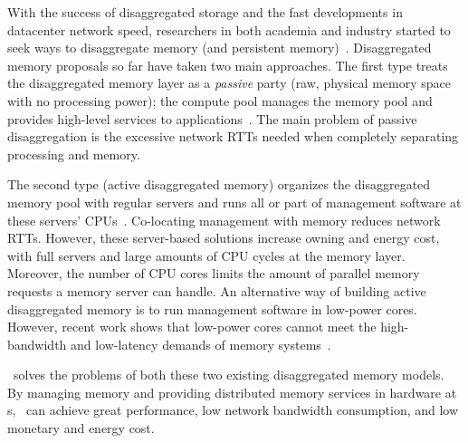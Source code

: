 With the success of disaggregated storage and the fast developments in datacenter network speed,
researchers in both academia and industry started to seek ways to disaggregate memory 
(and persistent memory)~\cite{Lim09-disaggregate,FireBox-FASTKeynote,IntelRackScale,Lim12-HPCA,Shan18-OSDI,RAMCloud,Tsai20-ATC}.
Disaggregated memory proposals so far have taken two main approaches.
The first type treats the disaggregated memory layer as a {\em passive} party (raw, physical memory space with no processing power);
the compute pool manages the memory pool and provides high-level services to applications~\cite{HP-TheMachine,Tsai20-ATC,Lim09-disaggregate,Nitu18-EUROSYS}.
The main problem of passive disaggregation is the excessive network RTTs needed when completely separating processing and memory.

The second type (active disaggregated memory) organizes the disaggregated memory pool with regular servers and runs all or part of management software 
at these servers' CPUs~\cite{InfiniSwap,NAMDB,Kalia14-RDMAKV,Aguilera18-ATC}. 
Co-locating management with memory reduces network RTTs.
However, these server-based solutions increase owning and energy cost, with full servers and large amounts of CPU cycles at the memory layer.
Moreover, the number of CPU cores limits the amount of parallel memory requests a memory server can handle.
An alternative way of building active disaggregated memory is to run management software in low-power cores.
However, recent work shows that low-power cores cannot meet the high-bandwidth and low-latency demands of memory systems~\cite{Tsai20-ATC}.

\phdm\ solves the problems of both these two existing disaggregated memory models.
By managing memory and providing distributed memory services in hardware at \MN{}s,
\phdm\ can achieve great performance, low network bandwidth consumption, and low monetary and energy cost.

